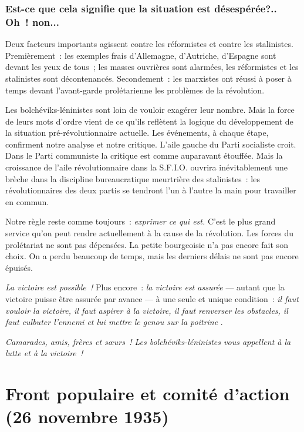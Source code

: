 \documentclass[french,twoside]{book} %
\begin{document}
\subsubsection[{Est-ce que cela signifie que la situation est désespérée?.. Oh ! non...}]{Est-ce que cela signifie que la situation est désespérée?.. Oh ! non...}
\noindent Deux facteurs importants agissent contre les réformistes et contre les stalinistes. Premièrement : les exemples frais d’Allemagne, d’Autriche, d’Espagne sont devant les yeux de tous ; les masses ouvrières sont alarmées, les réformistes et les stalinistes sont décontenancés. Secondement : les marxistes ont réussi à poser à temps devant l’avant-garde prolétarienne les problèmes de la révolution.\par
Les bolchéviks-léninistes sont loin de vouloir exagérer leur nombre. Mais la force de leurs mots d’ordre vient de ce qu’ils reflètent la logique du développement de la situation pré-révolutionnaire actuelle. Les événements, à chaque étape, confirment notre analyse et notre critique. L’aile gauche du Parti socialiste croit. Dans le Parti communiste la critique est comme auparavant étouffée. Mais la croissance de l’aile révolutionnaire dans la S.F.I.O. ouvrira inévitablement une brèche dans la discipline bureaucratique meurtrière des stalinistes : les  révolutionnaires des deux partis se tendront l’un à l’autre la main pour travailler en commun.\par
Notre règle reste comme toujours : \emph{exprimer ce qui est. }C’est le plus grand service qu’on peut rendre actuellement à la cause de la révolution. Les forces du prolétariat ne sont pas dépensées. La petite bourgeoisie n’a pas encore fait son choix. On a perdu beaucoup de temps, mais les derniers délais ne sont pas encore épuisés.\par
\emph{La victoire est possible !} Plus encore : \emph{la victoire est assurée} — autant que la victoire puisse être assurée par avance — à une seule et unique condition : \emph{il faut vouloir la victoire, il faut aspirer à la victoire, il faut renverser les obstacles, il faut culbuter l’ennemi et lui mettre le genou sur la poitrine} .\par
 \emph{Camarades, amis, frères et sœurs ! Les bolchéviks-léninistes vous appellent à la lutte et à la victoire !} 
 \section[{Front populaire et comité d’action, (26 novembre 1935)}]{Front populaire et comité d’action \\
(26 novembre 1935)}
\label{p4}\renewcommand{\leftmark}{Front populaire et comité d’action \\
(26 novembre 1935)}
\end{document}
